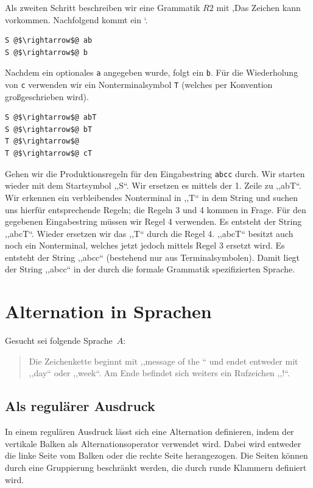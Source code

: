 Als zweiten Schritt beschreiben wir eine Grammatik $R2$ mit ,Das Zeichen  kann vorkommen. Nachfolgend kommt ein `.
\begin{lstlisting}
S @$\rightarrow$@ ab
S @$\rightarrow$@ b
\end{lstlisting}

Nachdem ein optionales \texttt{a} angegeben wurde, folgt ein \texttt{b}. Für die Wiederholung von \texttt{c} verwenden wir ein Nonterminalsymbol \texttt{T} (welches per Konvention großgeschrieben wird).
\begin{lstlisting}
S @$\rightarrow$@ abT
S @$\rightarrow$@ bT
T @$\rightarrow$@
T @$\rightarrow$@ cT
\end{lstlisting}

Gehen wir die Produktionsregeln für den Eingabestring \texttt{abcc} durch. Wir starten wieder mit dem Startsymbol ,,S``. Wir ersetzen es mittels der 1. Zeile zu ,,abT``. Wir erkennen ein verbleibendes Nonterminal in ,,T`` in dem String und suchen uns hierfür entsprechende Regeln; die Regeln 3 und 4 kommen in Frage. Für den gegebenen Eingabestring müssen wir Regel 4 verwenden. Es entsteht der String ,,abcT``. Wieder ersetzen wir das ,,T`` durch die Regel 4. ,,abcT`` besitzt auch noch ein Nonterminal, welches jetzt jedoch mittels Regel 3 ersetzt wird. Es entsteht der String ,,abcc`` (bestehend nur aus Terminalsymbolen). Damit liegt der String ,,abcc`` in der durch die formale Grammatik spezifizierten Sprache.

\section{Alternation in Sprachen}
%
Gesucht sei folgende Sprache~$A$:
\begin{quote}
  Die Zeichenkette beginnt mit ,,message of the `` und endet entweder mit ,,day`` oder ,,week``. Am Ende befindet sich weiters ein Rufzeichen ,,{!}``.
\end{quote}

\subsection{Als regulärer Ausdruck}
%
In einem regulären Ausdruck lässt sich eine Alternation definieren, indem der vertikale Balken als Alternationsoperator verwendet wird. Dabei wird entweder die linke Seite vom Balken oder die rechte Seite herangezogen. Die Seiten können durch eine Gruppierung beschränkt werden, die durch runde Klammern definiert wird.

